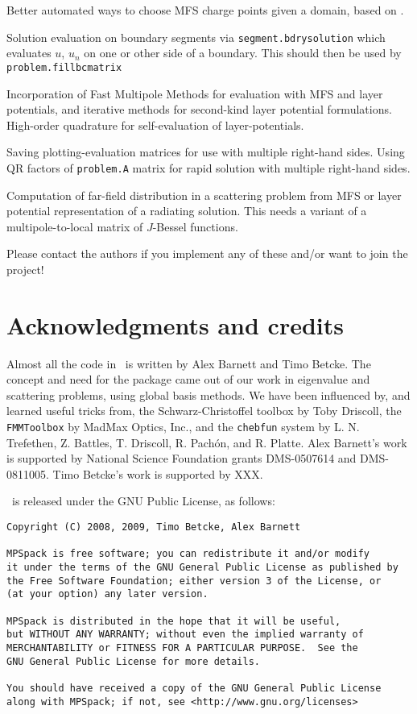 \documentclass[12pt]{article}
\begin{document}
\item Better automated ways to choose MFS charge points given a domain,
based on \cite{mfs}.

\item Solution evaluation on boundary segments via {\tt segment.bdrysolution}
 which evaluates $u$, $u_n$ on one
or other side of a boundary.
This should then be used by {\tt problem.fillbcmatrix}

\item Incorporation of Fast Multipole Methods for evaluation with MFS and
layer potentials, and iterative
methods for second-kind layer potential formulations.
High-order quadrature for self-evaluation of layer-potentials.

\item Saving plotting-evaluation matrices
for use with multiple right-hand sides.
Using QR factors of {\tt problem.A} matrix
for rapid solution with multiple right-hand sides.

\item Computation of far-field distribution in a scattering problem
from MFS or layer potential
representation of a radiating solution. This needs a variant of a
multipole-to-local matrix of $J$-Bessel functions.
\ei

Please contact the authors if you implement any of these and/or want
to join the project!



\section{Acknowledgments and credits}

Almost all the code in \mpspack\ is written by 
Alex Barnett and Timo Betcke.
The concept and need for the package came out of our work in eigenvalue
and scattering problems, using global basis methods.
We have been influenced by, and learned useful tricks from,
the Schwarz-Christoffel toolbox by Toby Driscoll,
the {\tt FMMToolbox} by MadMax Optics, Inc.,
and the {\tt chebfun} system
by L. N. Trefethen, Z. Battles, T. Driscoll, R. Pach\'{o}n, and R. Platte.
Alex Barnett's work is supported by National Science Foundation
grants DMS-0507614 and DMS-0811005.
Timo Betcke's work is supported by XXX.

\mpspack\ is released under the GNU Public License, as follows:
\begin{verbatim}
Copyright (C) 2008, 2009, Timo Betcke, Alex Barnett

MPSpack is free software; you can redistribute it and/or modify
it under the terms of the GNU General Public License as published by
the Free Software Foundation; either version 3 of the License, or
(at your option) any later version.

MPSpack is distributed in the hope that it will be useful,
but WITHOUT ANY WARRANTY; without even the implied warranty of
MERCHANTABILITY or FITNESS FOR A PARTICULAR PURPOSE.  See the
GNU General Public License for more details.

You should have received a copy of the GNU General Public License
along with MPSpack; if not, see <http://www.gnu.org/licenses>
\end{verbatim}
\end{document}
